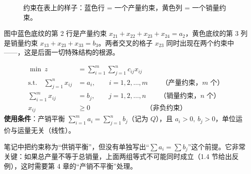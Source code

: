 \begin{figure}[H]
\centering
{}
\caption{约束在表上的样子：蓝色行 = 一个产量约束，黄色列 = 一个销量约束。}\label{fig:cons}
\end{figure}
图中蓝色底纹的第 2 行是产量约束 $x_{21}+x_{22}+x_{23}+x_{24}=a_2$，黄色底纹的第 3 列是销量约束 $x_{13}+x_{23}+x_{33}=b_3$。两者交叉的格子 $x_{23}$ 同时出现在两个约束中——，这是后面一切特殊结构的根源。

\begin{formulabox}[产销平衡运输问题的数学模型]
\[
\boxed{\begin{aligned}
\min\ z&=\sum_{i=1}^{m}\sum_{j=1}^{n}c_{ij}x_{ij}\\
\text{s.t.}\quad \sum_{j=1}^{n}x_{ij}&=a_i,\qquad i=1,2,\dots,m\qquad\text{（产量约束，$m$ 个）}\\
\sum_{i=1}^{m}x_{ij}&=b_j,\qquad j=1,2,\dots,n\qquad\text{（销量约束，$n$ 个）}\\
x_{ij}&\ge 0\qquad\qquad\qquad\qquad\ \text{（非负约束）}
\end{aligned}}
\]
\textbf{使用条件}：产销平衡 $\displaystyle\sum_{i=1}^m a_i=\sum_{j=1}^n b_j$（记为 $Q$），且 $a_i>0,\ b_j>0$，单位运价与运量无关（线性）。
\end{formulabox}
\supp 笔记中把约束称为“供销平衡”，但没有单独写出“$\sum a_i=\sum b_j$”这个前提。它非常关键：如果总产量不等于总销量，上面两组等式不可能同时成立（1.4 节给出反例），这时需要第 4 章的“产销不平衡”处理。

